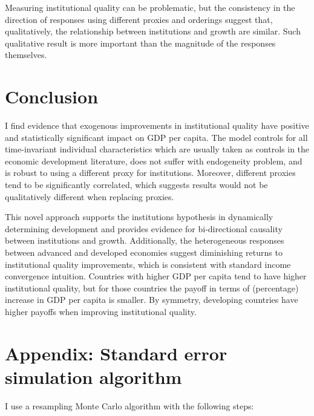 \documentclass{article}
\begin{document}
Measuring institutional quality can be problematic, but the consistency in the direction of responses using different proxies and orderings suggest that, qualitatively, the relationship between institutions and growth are similar. Such qualitative result is more important than the magnitude of the responses themselves.

\section{Conclusion}

I find evidence that exogenous improvements in institutional quality have positive and statistically significant impact on GDP per capita. The model controls for all time-invariant individual characteristics which are usually taken as controls in the economic development literature, does not suffer with endogeneity problem, and is robust to using a different proxy for institutions. Moreover, different proxies tend to be significantly correlated, which suggests results would not be qualitatively different when replacing proxies. 

This novel approach supports the institutions hypothesis in dynamically determining development and provides evidence for bi-directional causality between institutions and growth. Additionally, the heterogeneous responses between advanced and developed economies suggest diminishing returns to institutional quality improvements, which is consistent with standard income convergence intuition. Countries with higher GDP per capita tend to have higher institutional quality, but for those countries the payoff in terms of (percentage) increase in GDP per capita is smaller. By symmetry, developing countries have higher payoffs when improving institutional quality.

\printbibliography

\newpage

\appendix
{}
\section{Appendix: Standard error simulation algorithm}

I use a resampling Monte Carlo algorithm with the following steps:
\end{document}
